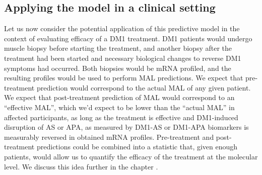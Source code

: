 \documentclass[10pt,letterpaper]{article}
\begin{document}
\subsection*{Applying the model in a clinical setting}

Let us now consider the potential application of this predictive model in the context of evaluating efficacy of a DM1 treatment. DM1 patients would undergo muscle biopsy before starting the treatment, and another biopsy after the treatment had been started and necessary biological changes to reverse DM1 symptoms had occurred. Both biopsies would be mRNA profiled, and the resulting profiles would be used to perform MAL predictions. We expect that pre-treatment prediction would correspond to the actual MAL of any given patient. We expect that post-treatment prediction of MAL would correspond to an ``effective MAL'', which we'd expect to be lower than the ``actual MAL'' in affected participants, as long as the treatment is effective and DM1-induced disruption of AS or APA, as measured by DM1-AS or DM1-APA biomarkers is measurably reversed in obtained mRNA profiles. Pre-treatment and post-treatment predictions could be combined into a statistic that, given enough patients, would allow us to quantify the efficacy of the treatment at the molecular level. We discuss this idea further in the chapter .
\end{document}
